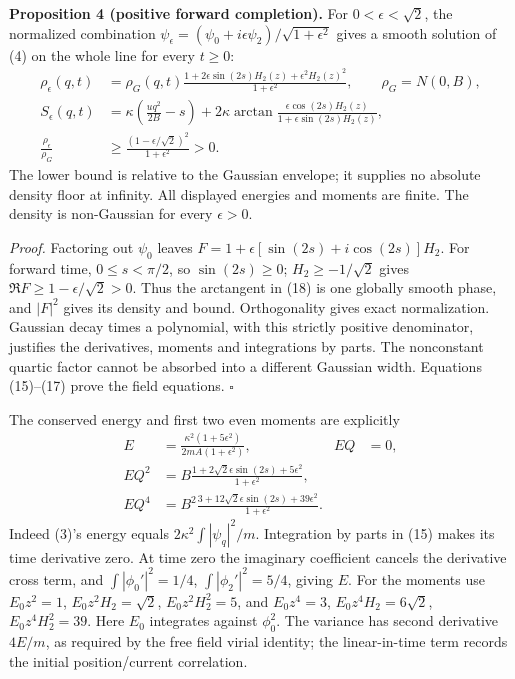 \documentclass[11pt,a4paper]{article}
\begin{document}
\textbf{Proposition 4 (positive forward completion).} For
\(0<\epsilon<\sqrt2\), the normalized combination
\(\psi_\epsilon=(\psi_0+i\epsilon\psi_2)/\sqrt{1+\epsilon^2}\) gives a
smooth solution of (4) on the whole line for every \(t\ge0\):
\[\begin{aligned}
\rho_\epsilon(q,t)&=\rho_G(q,t)
 \frac{1+2\epsilon\sin(2s)H_2(z)+\epsilon^2H_2(z)^2}
      {1+\epsilon^2},\qquad \rho_G=N(0,B),\\
S_\epsilon(q,t)&=\kappa\left(\frac{uq^2}{2B}-s\right)
 +2\kappa\arctan\frac{\epsilon\cos(2s)H_2(z)}
                          {1+\epsilon\sin(2s)H_2(z)},\\
\frac{\rho_\epsilon}{\rho_G}&\ge
 \frac{(1-\epsilon/\sqrt2)^2}{1+\epsilon^2}>0.
\end{aligned}\tag{18}\] The lower bound is relative to the Gaussian
envelope; it supplies no absolute density floor at infinity. All
displayed energies and moments are finite. The density is non-Gaussian
for every \(\epsilon>0\).

\emph{Proof.} Factoring out \(\psi_0\) leaves
\(F=1+\epsilon[\sin(2s)+i\cos(2s)]H_2\). For forward time,
\(0\le s<\pi/2\), so \(\sin(2s)\ge0\); \(H_2\ge-1/\sqrt2\) gives
\(\Re F\ge1-\epsilon/\sqrt2>0\). Thus the arctangent in (18) is one
globally smooth phase, and \(|F|^2\) gives its density and bound.
Orthogonality gives exact normalization. Gaussian decay times a
polynomial, with this strictly positive denominator, justifies the
derivatives, moments and integrations by parts. The nonconstant quartic
factor cannot be absorbed into a different Gaussian width. Equations
(15)--(17) prove the field equations. \(\square\)

The conserved energy and first two even moments are explicitly
\[\begin{aligned}
E&=\frac{\kappa^2(1+5\epsilon^2)}{2mA(1+\epsilon^2)},&E Q&=0,\\
E Q^2&=B\frac{1+2\sqrt2\epsilon\sin(2s)+5\epsilon^2}
                  {1+\epsilon^2},\\
E Q^4&=B^2\frac{3+12\sqrt2\epsilon\sin(2s)+39\epsilon^2}
                    {1+\epsilon^2}.
\end{aligned}\tag{19}\] Indeed (3)'s energy equals
\(2\kappa^2\int|\psi_q|^2/m\). Integration by parts in (15) makes its
time derivative zero. At time zero the imaginary coefficient cancels the
derivative cross term, and \(\int|\phi_0'|^2=1/4\),
\(\int|\phi_2'|^2=5/4\), giving \(E\). For the moments use \(E_0z^2=1\),
\(E_0z^2H_2=\sqrt2\), \(E_0z^2H_2^2=5\), and \(E_0z^4=3\),
\(E_0z^4H_2=6\sqrt2\), \(E_0z^4H_2^2=39\). Here \(E_0\) integrates
against \(\phi_0^2\). The variance has second derivative \(4E/m\), as
required by the free field virial identity; the linear-in-time term
records the initial position/current correlation.
\end{document}
